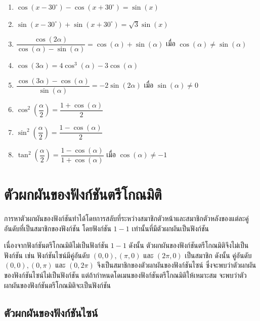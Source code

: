 \begin{enumerate}[label=\arabic*., leftmargin=*, itemsep=1em]
\begin{enumerate}[label=\theenumi\arabic*), leftmargin=1.5em, itemsep=0.6em]
		\item $\cos \left( x - 30^{\circ} \right) - \cos \left( x + 30^{\circ} \right) = \sin \left( x \right)$
		\item $\sin \left( x - 30^{\circ} \right) + \sin \left( x + 30^{\circ} \right) = \sqrt{3} \sin \left( x \right)$
		\item $\dfrac{\cos \left( 2\alpha \right)}{\cos \left( \alpha \right) - \sin \left( \alpha \right)} = \cos \left( \alpha \right) + \sin \left( \alpha \right)$ เมื่อ $\cos \left( \alpha \right) \neq \sin \left( \alpha \right)$
		\item $\cos \left( 3\alpha \right) = 4\cos^{3} \left( \alpha \right) - 3\cos \left( \alpha \right)$
		\item $\dfrac{\cos \left( 3\alpha \right) - \cos \left( \alpha \right)}{\sin \left( \alpha \right)} = -2\sin \left( 2\alpha \right)$ เมื่อ $\sin \left( \alpha \right) \neq 0$
		\item $\cos^{2} \left( \dfrac{\alpha}{2} \right) = \dfrac{1 + \cos \left( \alpha \right)}{2}$
		\item $\sin^{2} \left( \dfrac{\alpha}{2} \right) = \dfrac{1 - \cos \left( \alpha \right)}{2}$
		\item $\tan^{2} \left( \dfrac{\alpha}{2} \right) = \dfrac{1 - \cos \left( \alpha \right)}{1 + \cos \left( \alpha \right)}$ เมื่อ $\cos \left( \alpha \right) \neq -1$
	\end{enumerate}
\end{enumerate}
\newpage
\section{ตัวผกผันของฟังก์ชันตรีโกณมิติ}

การหาตัวผกผันของฟังก์ชันทำได้โดยการสลับที่ระหว่างสมาชิกตัวหน้าและสมาชิกตัวหลังของแต่ละคู่อันดับที่เป็นสมาชิกของฟังก์ชัน โดยฟังก์ชัน $1-1$ เท่านั้นที่มีตัวผกผันเป็นฟังก์ชัน

เนื่องจากฟังก์ชันตรีโกณมิติไม่เป็นฟังก์ชัน $1-1$ ดังนั้น ตัวผกผันของฟังก์ชันตรีโกณมิติจึงไม่เป็นฟังก์ชัน เช่น ฟังก์ชันไซน์มีคู่อันดับ $(0,0),(\pi,0)$ และ $(2\pi,0)$ เป็นสมาชิก ดังนั้น คู่อันดับ $(0,0),(0,\pi)$ และ $(0,2\pi)$ จึงเป็นสมาชิกของตัวผกผันของฟังก์ชันไซน์ ซึ่งจะพบว่าตัวผกผันของฟังก์ชันไซน์ไม่เป็นฟังก์ชัน แต่ถ้ากำหนดโดเมนของฟังก์ชันตรีโกณมิติให้เหมาะสม จะพบว่าตัวผกผันของฟังก์ชันตรีโกณมิติจะเป็นฟังก์ชัน

\subsection*{ตัวผกผันของฟังก์ชันไซน์}

